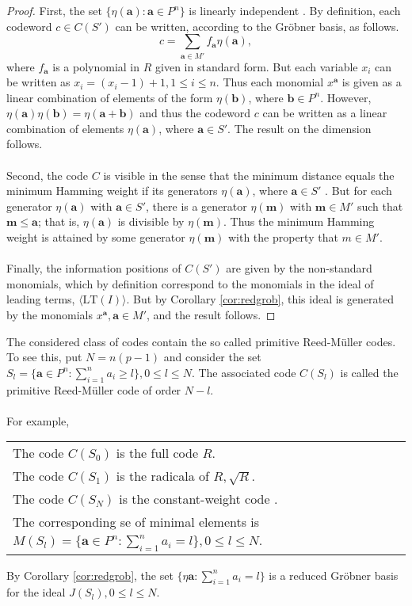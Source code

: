 \documentclass[english,bachelor]{liumaiex}
\begin{document}
\begin{proof}
First, the set $\{\eta(\mathbf{a})\colon\mathbf{a}\in P^n\}$ is linearly independent \cite{berman,charpin}. By definition, each codeword $c\in C(S')$ can be written, according to the Gröbner basis, as follows.
\begin{displaymath}
c=\sum_{\mathbf{a}\in M'} f_{\mathbf{a}}\eta(\mathbf{a}),
\end{displaymath}
where $f_{\mathbf{a}}$ is a polynomial in $R$ given in standard form. But each variable $x_i$ can be written as $x_i=(x_i-1)+1, 1\leq i\leq n$. Thus each monomial $x^{\mathbf{a}}$ is given as a linear combination of elements of the form $\eta(\mathbf{b})$, where $\mathbf{b}\in P^n$. However, $\eta(\mathbf{a})\eta(\mathbf{b})=\eta(\mathbf{a}+\mathbf{b})$ and thus the codeword $c$ can be written as a linear combination of elements $\eta(\mathbf{a})$, where $\mathbf{a}\in S'$. The result on the dimension follows. \\ \\
Second, the code $C$ is visible in the sense that the minimum distance equals the minimum Hamming weight if its generators $\eta(\mathbf{a})$, where $\mathbf{a}\in S'$ \cite{berman,charpin,ward}. But for each generator $\eta(\mathbf{a})$ with $\mathbf{a}\in S'$, there is a generator $\eta(\mathbf{m})$ with $\mathbf{m}\in M'$ such that $\mathbf{m}\leq\mathbf{a}$; that is, $\eta(\mathbf{a})$ is divisible by $\eta(\mathbf{m})$. Thus the minimum Hamming weight is attained by some generator $\eta(\mathbf{m})$ with the property that $m\in M'$.\\ \\
Finally, the information positions of $C(S')$ are given by the non-standard monomials, which by definition correspond to the monomials in the ideal of leading terms, $\langle \textrm{LT}(I)\rangle$. But by Corollary \ref{cor:redgrob}, this ideal is generated by the monomials $x^\mathbf{a}, \mathbf{a}\in M'$, and the result follows.
\end{proof}
The considered class of codes contain the so called primitive Reed-M{\"u}ller codes. To see this, put $N=n(p-1)$ and consider the set $S_l=\{\mathbf{a}\in P^n\colon \sum_{i=1}^{n}a_i\geq l\}, 0\leq l\leq N$. The associated code $C(S_l)$ is called the primitive Reed-M{\"u}ller code of order $N-l$. \\ \\
For example,\\
\begin{tabular}{l}
The code $C(S_0)$ is the full code $R$.\\
The code $C(S_1)$ is the radicala of $R, \sqrt{R}$.\\
The code $C(S_N)$ is the constant-weight code \cite{berman,charpin}.\\
The corresponding se of minimal elements is $M(S_l)=\{\mathbf{a}\in P^n\colon \sum_{i=1}^{n}a_i=l\}, 0\leq l\leq N$.
\end{tabular}
By Corollary \ref{cor:redgrob}, the set $\{\eta\mathbf{a}\colon\sum_{i=1}^{n}a_i=l\}$ is a reduced Gröbner basis for the ideal $J(S_l), 0\leq l\leq N$.
\end{document}
